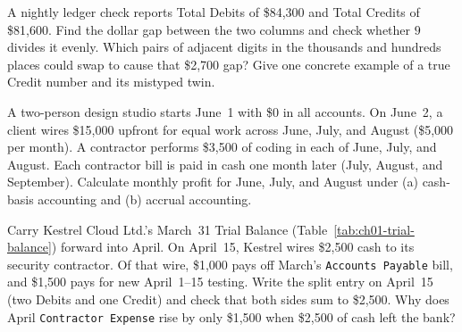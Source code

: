 \begin{exercise}
\label{ex:ch01-transposition}
A nightly ledger check reports Total Debits of \$84,300 and Total Credits of \$81,600. Find the dollar gap between the two columns and check whether $9$ divides it evenly. Which pairs of adjacent digits in the thousands and hundreds places could swap to cause that \$2,700 gap? Give one concrete example of a true Credit number and its mistyped twin.
\end{exercise}

\begin{exercise}
\label{ex:ch01-cash-vs-accrual}
A two-person design studio starts June~1 with \$0 in all accounts. On June~2, a client wires \$15,000 upfront for equal work across June, July, and August (\$5,000 per month). A contractor performs \$3,500 of coding in each of June, July, and August. Each contractor bill is paid in cash one month later (July, August, and September). Calculate monthly profit for June, July, and August under (a) cash-basis accounting and (b) accrual accounting.
\end{exercise}

\begin{exercise}
\label{ex:ch01-relaypay-tx8}
Carry Kestrel Cloud Ltd.'s March~31 Trial Balance (Table~\ref{tab:ch01-trial-balance}) forward into April. On April~15, Kestrel wires \$2,500 cash to its security contractor. Of that wire, \$1,000 pays off March's \texttt{Accounts Payable} bill, and \$1,500 pays for new April~1--15 testing. Write the split entry on April~15 (two Debits and one Credit) and check that both sides sum to \$2,500. Why does April \texttt{Contractor Expense} rise by only \$1,500 when \$2,500 of cash left the bank?
\end{exercise}
